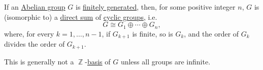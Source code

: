 \begin{theorem}\label{thm:fundamental_theorem_of_finitely_generated_abelian_groups}
  If an \hyperref[def:abelian_group]{Abelian group} \( G \) is \hyperref[def:semimodule/generated]{finitely generated}, then, for some positive integer \( n \), \( G \) is (isomorphic to) a \hyperref[def:external_semimodule_direct_sum]{direct sum} of \hyperref[def:cyclic_group]{cyclic groups}, i.e.
  \begin{equation}\label{eq:thm:fundamental_theorem_of_finitely_generated_abelian_groups}
    G \cong G_1 \oplus \cdots \oplus G_n,
  \end{equation}
  where, for every \( k = 1, \ldots, n - 1 \), if \( G_{k+1} \) is finite, so is \( G_k \), and the order of \( G_k \) divides the order of \( G_{k+1} \).
\end{theorem}
\begin{comments}
  \item This is generally not a \( \BbbZ \)-\hyperref[def:hamel_basis]{basis} of \( G \) unless all groups are infinite.
\end{comments}
